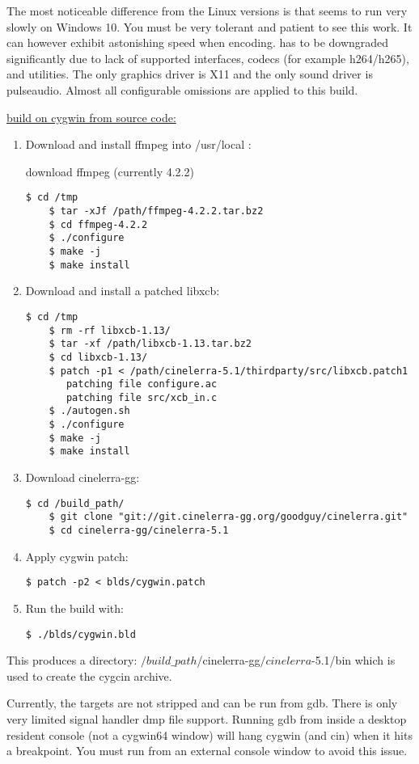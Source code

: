 The most noticeable difference from the Linux versions is that \CGG{} seems to run 
very slowly on Windows 10. You must be very tolerant and patient to see this work.  
It can however exhibit astonishing speed when encoding.  \CGG{} has to be downgraded significantly due to lack of supported interfaces, codecs (for example h264/h265), and utilities.  
The only graphics driver is X11 and the only sound driver is pulseaudio.  Almost all configurable
omissions are applied to this build.  

\underline{\CGG{} build on cygwin from source code:}

\begin{enumerate}
	\item Download and install ffmpeg into /usr/local :

   	download ffmpeg (currently 4.2.2)
\begin{lstlisting}[style=sh]
	$ cd /tmp
	$ tar -xJf /path/ffmpeg-4.2.2.tar.bz2
	$ cd ffmpeg-4.2.2
	$ ./configure
	$ make -j
	$ make install
\end{lstlisting}
	\item Download and install a patched libxcb:
\begin{lstlisting}[style=sh]
	$ cd /tmp
	$ rm -rf libxcb-1.13/
	$ tar -xf /path/libxcb-1.13.tar.bz2
	$ cd libxcb-1.13/
	$ patch -p1 < /path/cinelerra-5.1/thirdparty/src/libxcb.patch1
	   patching file configure.ac
	   patching file src/xcb_in.c
	$ ./autogen.sh
	$ ./configure
	$ make -j
	$ make install
\end{lstlisting}
	\item Download cinelerra-gg:
\begin{lstlisting}[style=sh]
	$ cd /build_path/
	$ git clone "git://git.cinelerra-gg.org/goodguy/cinelerra.git"
	$ cd cinelerra-gg/cinelerra-5.1
\end{lstlisting}
	\item Apply cygwin patch:
\begin{lstlisting}[style=sh]
	$ patch -p2 < blds/cygwin.patch
\end{lstlisting}
	\item Run the build with:
\begin{lstlisting}[style=sh]
	$ ./blds/cygwin.bld
\end{lstlisting}
\end{enumerate}

This produces a directory: $/build\_path$/cinelerra-gg$/cinelerra$-5.1/bin
which is used to create the cygcin archive.

Currently, the targets are not stripped and can be run from gdb.
There is only very limited signal handler dmp file support.
Running gdb from inside a desktop resident console (not a cygwin64 window) will hang cygwin (and cin) when it hits a breakpoint.  You must run from an external console window to avoid this issue.


